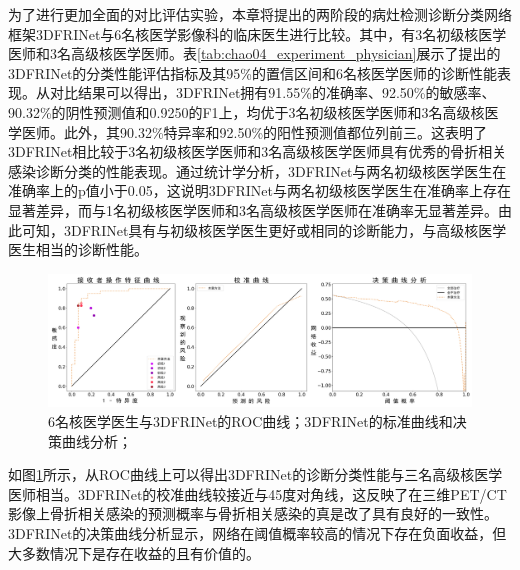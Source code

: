 为了进行更加全面的对比评估实验，本章将提出的两阶段的病灶检测诊断分类网络框架3DFRINet与6名核医学影像科的临床医生进行比较。其中，有3名初级核医学医师和3名高级核医学医师。表\ref{tab:chao04_experiment_physician}展示了提出的3DFRINet的分类性能评估指标及其95\%的置信区间和6名核医学医师的诊断性能表现。从对比结果可以得出，3DFRINet拥有91.55\%的准确率、92.50\%的敏感率、90.32\%的阴性预测值和0.9250的F1上，均优于3名初级核医学医师和3名高级核医学医师。此外，其90.32\%特异率和92.50\%的阳性预测值都位列前三。这表明了3DFRINet相比较于3名初级核医学医师和3名高级核医学医师具有优秀的骨折相关感染诊断分类的性能表现。通过统计学分析，3DFRINet与两名初级核医学医生在准确率上的p值小于0.05，这说明3DFRINet与两名初级核医学医生在准确率上存在显著差异，而与1名初级核医学医师和3名高级核医学医师在准确率无显著差异。由此可知，3DFRINet具有与初级核医学医生更好或相同的诊断能力，与高级核医学医生相当的诊断性能。

\begin{figure}[htbp]
    \centering
    \includegraphics[width=\textwidth]{figures/chap04_eval.jpg}
    \caption{6名核医学医生与3DFRINet的ROC曲线；3DFRINet的标准曲线和决策曲线分析；}
    \label{fig:chap04_eval}
\end{figure}

如图\ref{fig:chap04_eval}所示，从ROC曲线上可以得出3DFRINet的诊断分类性能与三名高级核医学医师相当。3DFRINet的校准曲线较接近与45度对角线，这反映了在三维PET/CT影像上骨折相关感染的预测概率与骨折相关感染的真是改了具有良好的一致性。3DFRINet的决策曲线分析显示，网络在阈值概率较高的情况下存在负面收益，但大多数情况下是存在收益的且有价值的。

